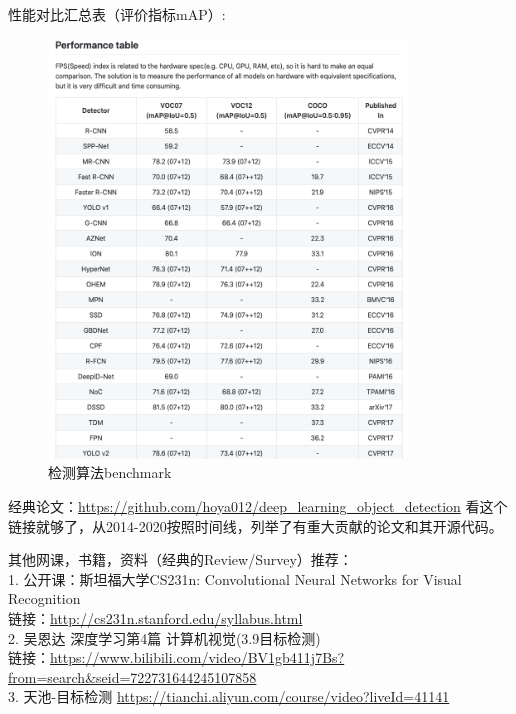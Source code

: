\documentclass[lang=cn,11pt,a4paper]{eleganttemplate}
\begin{document}
性能对比汇总表（评价指标mAP）:
\begin{figure}[htbp]
  \centering
  \includegraphics[width=0.85\textwidth]{image/cv_5.png}
  \caption{检测算法benchmark}
\end{figure}

\hfill 

经典论文：\href{https://github.com/hoya012/deep_learning_object_detection}{https://github.com/hoya012/deep\_learning\_object\_detection}
看这个链接就够了，从2014-2020按照时间线，列举了有重大贡献的论文和其开源代码。

\hfill 

其他网课，书籍，资料（经典的Review/Survey）推荐：\\
1.	公开课：斯坦福大学CS231n: Convolutional Neural Networks for Visual Recognition\\
链接：\href{http://cs231n.stanford.edu/syllabus.html}{http://cs231n.stanford.edu/syllabus.html}\\
2.	吴恩达 深度学习第4篇 计算机视觉(3.9目标检测)\\
链接：\href{https://www.bilibili.com/video/BV1gb411j7Bs?from=search&seid=722731644245107858}{https://www.bilibili.com/video/BV1gb411j7Bs?from=search\&seid=722731644245107858}\\
3.	天池-目标检测 \href{https://tianchi.aliyun.com/course/video?liveId=41141}{https://tianchi.aliyun.com/course/video?liveId=41141}
\end{document}
